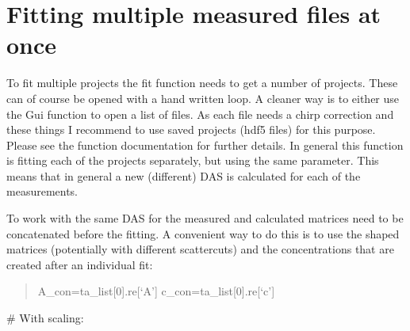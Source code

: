\documentclass[letterpaper,10pt,english]{sphinxmanual}
\begin{document}
\section{Fitting multiple measured files at once}
\label{\detokenize{Fitting:fitting-multiple-measured-files-at-once}}
To fit multiple projects the fit function needs to get a number of
projects. These can of course be opened with a hand written loop. A
cleaner way is to either use the Gui function to open a list of
files. {\hyperref[\detokenize{Opening:opening-multiple-files}]{}}
As each file needs a chirp correction and these things I
recommend to use saved projects (hdf5 files) for this purpose. Please see
the function documentation for further details. In general this function is
fitting each of the projects separately, but using the same parameter. This means
that in general a new (different) DAS is calculated for each of the measurements.

To work with the same DAS for the measured and calculated matrices need to be
concatenated before the fitting. A convenient way to do this is to use the
shaped matrices (potentially with different scattercuts) and the concentrations
that are created after an individual fit:

\begin{sphinxVerbatim}[commandchars=\\\{\}]
\end{sphinxVerbatim}
\begin{quote}

A\_con=ta\_list{[}0{]}.re{[}‘A’{]}
c\_con=ta\_list{[}0{]}.re{[}‘c’{]}
\end{quote}

\# With scaling:

\begin{sphinxVerbatim}[commandchars=\\\{\}]
\PYG{p}{[}\PYG{p}{[}\PYG{p}{]}\PYG{p}{[}\PYG{p}{]}\PYG{p}{[}\PYG{p}{]}\PYG{p}{[}\PYG{p}{]}\PYG{p}{[}\PYG{p}{]}\PYG{p}{[}\PYG{p}{]}\PYG{p}{]}
\PYG{p}{[}\PYG{p}{[}\PYG{p}{]}\PYG{p}{[}\PYG{p}{]}\PYG{p}{[}\PYG{p}{]}\PYG{p}{[}\PYG{p}{]}\PYG{p}{[}\PYG{p}{]}\PYG{p}{[}\PYG{p}{]}\PYG{p}{]}
\end{sphinxVerbatim}
\end{document}

